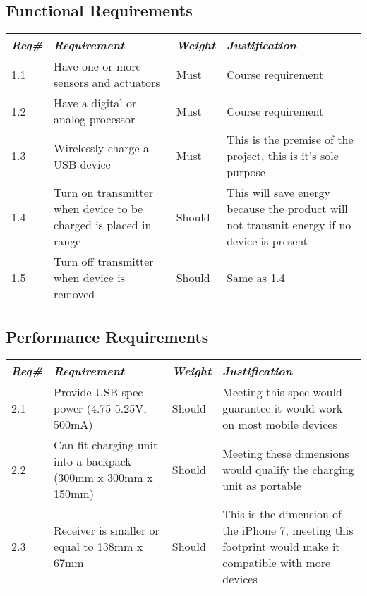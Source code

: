     \subsection{Functional Requirements}
        \begin{centering}
        \begin{tabular}{|l|m{7cm}|l|m{7cm}|} \hline
        \textit{\textbf{Req\#}}	& \textit{\textbf{Requirement}} &\textit{\textbf{Weight}}&\textit{\textbf{Justification}} \\ \hline
        1.1	& Have one or more sensors and actuators & Must	& Course requirement \\ \hline
        1.2	& Have a digital or analog processor & Must	& Course requirement \\ \hline
        1.3	& Wirelessly charge a USB device & Must	& This is the premise of the project, this is it's sole purpose \\ \hline
        1.4	& Turn on transmitter when device to be charged is placed in range	& Should & This will save energy because the product will not transmit energy if no device is present \\ \hline
        1.5 & Turn off transmitter when device is removed	& Should & Same as 1.4 \\ \hline
        \end{tabular}
        \end{centering}
    
    \subsection{Performance Requirements}
        \begin{centering}
        \begin{tabular}{|l|m{7cm}|l|m{7cm}|} \hline
        \textit{\textbf{Req\#}}	& \textit{\textbf{Requirement}} &\textit{\textbf{Weight}}&\textit{\textbf{Justification}} \\ \hline
        2.1	& Provide USB spec power (4.75-5.25V, 500mA) \cite{USB20}	& Should & Meeting this spec would guarantee it would work on most mobile devices \\ \hline
        2.2	& Can fit charging unit into a backpack (300mm x 300mm x 150mm)	& Should & Meeting these dimensions would qualify the charging unit as portable \\ \hline
        2.3	& Receiver is smaller or equal to 138mm x 67mm	& Should & This is the dimension of the iPhone 7, meeting this footprint would make it compatible with more devices \\ \hline
        \end{tabular}
        \end{centering}
    

